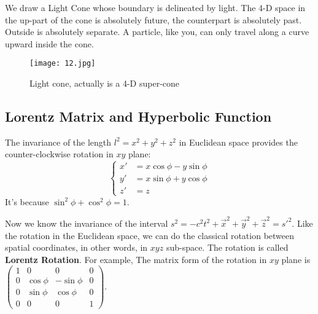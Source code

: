 \documentclass[openany,10pt]{book}
\theoremstyle{definition}
\theoremstyle{definition}
\theoremstyle{remark}
\begin{document}
We draw a Light Cone whose boundary is delineated by light. The 4-D space in the up-part of the cone is absolutely future, the counterpart is absolutely past. Outside is absolutely separate. A particle, like you, can only travel along a curve upward inside the cone.

\begin{figure}[htbp]
  \centering
    \texttt{[image: 12.jpg]}
    \caption{Light cone, actually is a 4-D super-cone}
\end{figure}

\subsection{Lorentz Matrix and Hyperbolic Function }\label{hyperbolic}
The invariance of the length $l^2=x^2+y^2+z^2$ in Euclidean space provides the counter-clockwise rotation in $xy$ plane:
\begin{equation}
\left\{
\begin{aligned}
x' & =  x \cos{\phi}-y \sin{\phi} \\
y' & = x \sin{\phi}+y\cos{\phi} \\
z' & = z
\end{aligned}
\right.
\end{equation}
It's because $\sin^2{\phi}+\cos^2{\phi}=1$.

Now we know the invariance of the interval $s^2=-c^2t^2+\vec x^2+\vec y^2+\vec z^2=s'^2$. Like the rotation in the Euclidean space, we can do the classical rotation between spatial coordinates, in other words, in $xyz$ sub-space. The rotation is called {\bfseries Lorentz Rotation}. For example, The matrix form of the rotation in $xy$ plane is $\begin{pmatrix}
   1& 0 & 0 & 0\\
   0 & \cos{\phi} & -\sin{\phi} & 0\\
   0 & \sin{\phi} & \cos{\phi} & 0\\
   0 &0 & 0& 1
  \end{pmatrix}$.
\end{document}
